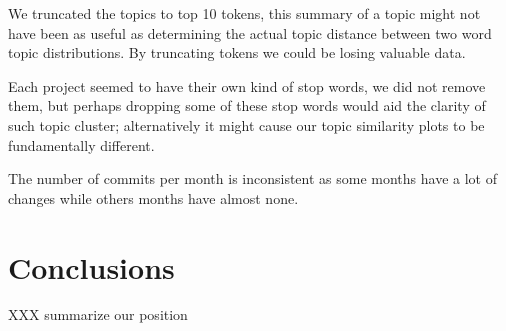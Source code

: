 \documentclass[times, 10pt,twocolumn]{article}
\begin{document}
We truncated the topics to top 10 tokens, this summary of a topic
might not have been as useful as determining the actual topic distance
between two word topic distributions. By truncating tokens we could be
losing valuable data.

Each project seemed to have their own kind of stop words, we did not
remove them, but perhaps dropping some of these stop words would aid
the clarity of such topic cluster; alternatively it might cause our
topic similarity plots to be fundamentally different. 

The number of
commits per month is inconsistent as some months have a lot of changes
while others months have almost none.





\section{Conclusions}











XXX summarize our position
\end{document}
